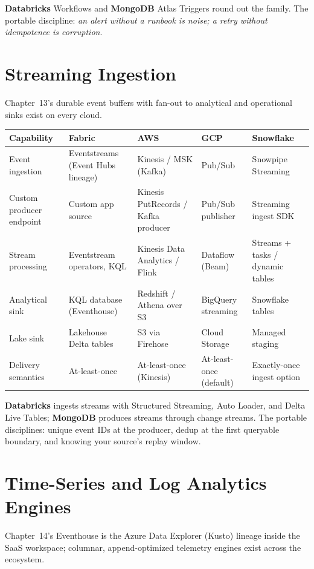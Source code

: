 \noindent \textbf{Databricks} Workflows and \textbf{MongoDB} Atlas Triggers round out the
family. The portable discipline: \emph{an alert without a runbook is noise; a retry without
idempotence is corruption}.

\section{Streaming Ingestion}
%
Chapter~13's durable event buffers with fan-out to analytical and operational sinks exist on
every cloud.

\begin{center}
\footnotesize
\begin{tabular}{@{}p{2.8cm}p{3.2cm}p{3.2cm}p{3.2cm}p{3.2cm}@{}}
\toprule
\textbf{Capability} & \textbf{Fabric} & \textbf{AWS} & \textbf{GCP} & \textbf{Snowflake} \\
\midrule
Event ingestion & Eventstreams (Event Hubs lineage) & Kinesis / MSK (Kafka) & Pub/Sub & Snowpipe Streaming \\
Custom producer endpoint & Custom app source & Kinesis PutRecords / Kafka producer & Pub/Sub publisher & Streaming ingest SDK \\
Stream processing & Eventstream operators, KQL & Kinesis Data Analytics / Flink & Dataflow (Beam) & Streams + tasks / dynamic tables \\
Analytical sink & KQL database (Eventhouse) & Redshift / Athena over S3 & BigQuery streaming & Snowflake tables \\
Lake sink & Lakehouse Delta tables & S3 via Firehose & Cloud Storage & Managed staging \\
Delivery semantics & At-least-once & At-least-once (Kinesis) & At-least-once (default) & Exactly-once ingest option \\
\bottomrule
\end{tabular}
\end{center}

\noindent \textbf{Databricks} ingests streams with Structured Streaming, Auto Loader, and Delta
Live Tables; \textbf{MongoDB} produces streams through change streams. The portable disciplines:
unique event IDs at the producer, dedup at the first queryable boundary, and knowing your
source's replay window.

\section{Time-Series and Log Analytics Engines}
%
Chapter~14's Eventhouse is the Azure Data Explorer (Kusto) lineage inside the SaaS workspace;
columnar, append-optimized telemetry engines exist across the ecosystem.


